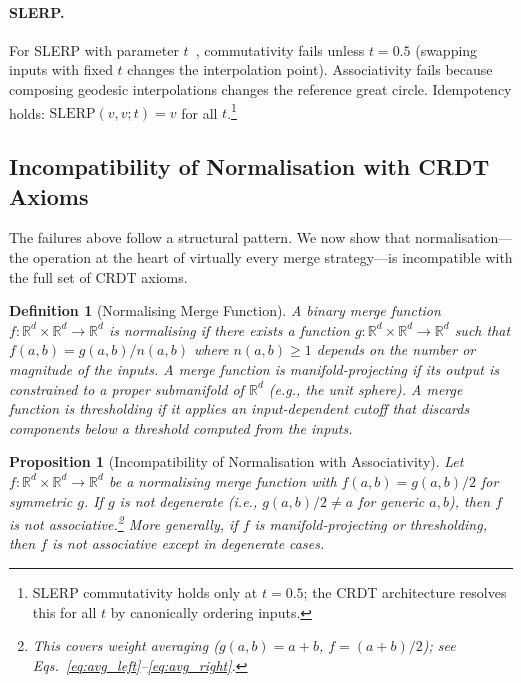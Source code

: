 \documentclass[10pt,letterpaper]{article}
\newtheorem{proposition}[theorem]{Proposition}
\newtheorem{definition}[theorem]{Definition}
\begin{document}
\paragraph{SLERP.}
For SLERP with parameter $t$~\cite{shoemake1985animating}, commutativity fails unless $t=0.5$ (swapping inputs with fixed $t$ changes the interpolation point).
Associativity fails because composing geodesic interpolations changes the reference great circle.
Idempotency holds: $\mathrm{SLERP}(v,v;t) = v$ for all $t$.\footnote{SLERP commutativity holds only at $t=0.5$; the CRDT architecture resolves this for all $t$ by canonically ordering inputs.}

\subsection{Incompatibility of Normalisation with CRDT Axioms}

The failures above follow a structural pattern.
We now show that normalisation---the operation at the heart of virtually every merge strategy---is incompatible with the full set of CRDT axioms.

\begin{definition}[Normalising Merge Function]
A binary merge function $f : \mathbb{R}^d \times \mathbb{R}^d \to \mathbb{R}^d$ is \emph{normalising} if there exists a function $g : \mathbb{R}^d \times \mathbb{R}^d \to \mathbb{R}^d$ such that $f(a,b) = g(a,b)/n(a,b)$ where $n(a,b) \geq 1$ depends on the number or magnitude of the inputs.
A merge function is \emph{manifold-projecting} if its output is constrained to a proper submanifold of $\mathbb{R}^d$ (e.g., the unit sphere).
A merge function is \emph{thresholding} if it applies an input-dependent cutoff that discards components below a threshold computed from the inputs.
\end{definition}

\begin{proposition}[Incompatibility of Normalisation with Associativity]\label{prop:incompat}
Let $f : \mathbb{R}^d \times \mathbb{R}^d \to \mathbb{R}^d$ be a normalising merge function with $f(a,b) = g(a,b)/2$ for symmetric $g$.
If $g$ is not degenerate (i.e., $g(a,b)/2 \neq a$ for generic $a,b$), then $f$ is not associative.\footnote{This covers weight averaging ($g(a,b)=a{+}b$, $f=(a{+}b)/2$); see Eqs.~\ref{eq:avg_left}--\ref{eq:avg_right}.}
More generally, if $f$ is manifold-projecting or thresholding, then $f$ is not associative except in degenerate cases.
\end{proposition}
\end{document}
